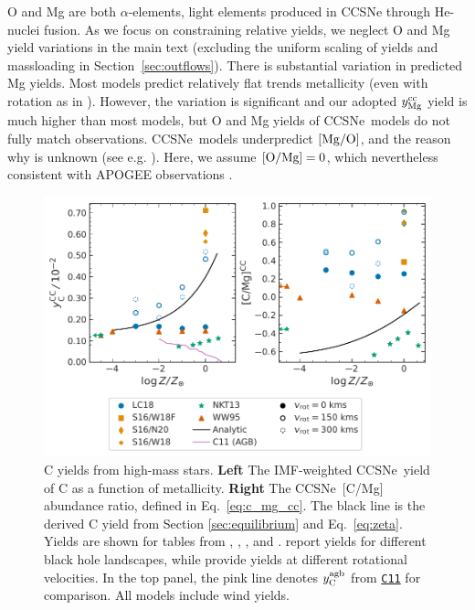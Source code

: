 \documentclass[fleqn,
usenatbib]{mnras}
\newcommand{\cxi}{\texttt{\hyperlink{C11}{C11}}}
\newcommand{\apogee}{APOGEE}
\newcommand{\cc}{CCSNe}
\newcommand{\imf}{IMF}
\newcommand{\Yoc}{\ensuremath{y_{\rm Mg}^{\rm cc}}}
\newcommand{\Ycagb}{\ensuremath{y_{\rm C}^{\rm agb}}}
\begin{document}
O and Mg are both $\alpha$-elements, light elements produced in \cc{} through He-nuclei fusion. 
As we focus on constraining relative yields, we neglect O and Mg yield variations in the main text (excluding the uniform scaling of yields and massloading in Section~\ref{sec:outflows}). There is substantial variation in predicted Mg yields. 
Most models predict relatively flat trends metallicity (even with rotation as in \citealt{LC18}). 
However, the variation is significant and our adopted $\Yoc$ yield is much higher than most models, but O and Mg yields of \cc\ models do not fully match observations. \cc\ models underpredict $[{\rm Mg}/{\rm O}]$, and the reason why is unknown (see e.g. \citealt{emily+21}). Here, we assume ${\rm [O/Mg]} = 0$, which nevertheless consistent with \apogee{} observations \citep{weinberg+19, weinberg+22}.
    

\begin{figure}
    \centering
    \includegraphics{cc_yields.pdf}
    \caption[]{
        C yields from high-mass stars.
        \textbf{Left} The \imf-weighted \cc\ yield of C as a function of metallicity.
        \textbf{Right} The \cc\ [C/Mg] abundance ratio, defined in Eq.~\ref{eq:c_mg_cc}. The black line is the derived C yield from Section \ref{sec:equilibrium} and Eq.~\ref{eq:zeta}. Yields are shown for tables from 
    \citet[red triangles]{WW95}, \citet[orange squares and diamonds]{sukhbold+16}, 
    \citet[green stars]{NKT13}, and \citet[blue circles]{LC18}. \citet{sukhbold+16} report yields for different black hole landscapes, while \citet{LC18} provide yields at different rotational velocities.
    In the top panel, the pink line denotes $\Ycagb$ from \cxi{} for comparison. All models include wind yields. 
}
    \label{fig:y_cc}
\end{figure}
\end{document}
